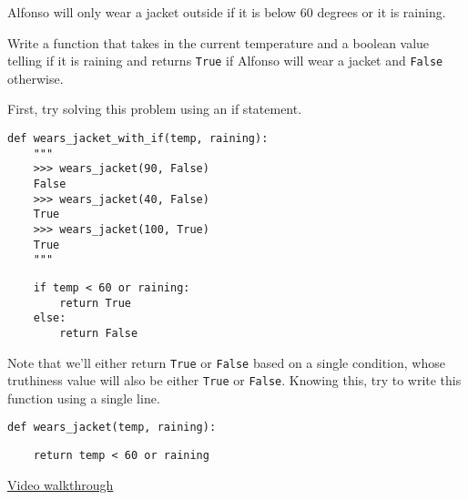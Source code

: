 \begin{blocksection}
\question Alfonso will only wear a jacket outside if it is below 60
degrees or it is raining.

Write a function that takes in the current temperature and a boolean value
telling if it is raining and returns \texttt{True} if Alfonso will wear a
jacket and \texttt{False} otherwise.

First, try solving this problem using an if statement.

\begin{lstlisting}
def wears_jacket_with_if(temp, raining):
    """
    >>> wears_jacket(90, False)
    False
    >>> wears_jacket(40, False)
    True
    >>> wears_jacket(100, True)
    True
    """
\end{lstlisting}
\begin{solution}[1in]
\begin{lstlisting}
    if temp < 60 or raining:
        return True
    else:
        return False
\end{lstlisting}
\end{solution}

Note that we'll either return \texttt{True} or \texttt{False} based on a single
condition, whose truthiness value will also be either \texttt{True} or
\texttt{False}. Knowing this, try to write this function using a single line.

\begin{lstlisting}
def wears_jacket(temp, raining):
\end{lstlisting}
\begin{solution}[0.25in]
\begin{lstlisting}
    return temp < 60 or raining
\end{lstlisting}
\href{https://www.youtube.com/watch?v=E8VPVCbyfiE&list=PLx38hZJ5RLZfg6jvEBBtjc5fnc5BclyEb&index=2&t=0s}{Video walkthrough}
\end{solution}
\end{blocksection}
